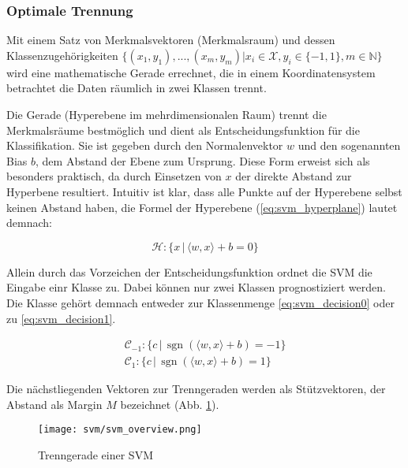 \subsubsection{Optimale Trennung}
Mit einem Satz von Merkmalsvektoren (Merkmalsraum) und dessen Klassenzugehörigkeiten $\{ (x_1, y_1), ..., (x_m, y_m) | x_i \in \mathcal{X}, y_i \in \{-1, 1\}, m \in \mathbb{N} \}$ wird eine mathematische Gerade errechnet,
die in einem Koordinatensystem betrachtet die Daten räumlich in zwei Klassen trennt. 



Die Gerade (Hyperebene im mehrdimensionalen Raum) trennt die Merkmalsräume bestmöglich und dient als Entscheidungsfunktion für die Klassifikation. Sie ist gegeben durch den Normalenvektor $w$ und den sogenannten Bias $b$, dem Abstand der Ebene zum Ursprung. Diese Form erweist sich als besonders praktisch, da durch Einsetzen von $x$ der direkte Abstand zur Hyperbene resultiert.
Intuitiv ist klar, dass alle Punkte auf der Hyperebene selbst keinen Abstand haben, die Formel der Hyperebene (\ref{eq:svm_hyperplane}) lautet demnach: 
 
\begin{equation}
\label{eq:svm_hyperplane}
    \mathcal{H}: \{ x \,|\, \langle w,x \rangle + b = 0 \}
\end{equation}
 
Allein durch das Vorzeichen der Entscheidungsfunktion ordnet die \ac{SVM} die Eingabe einr Klasse zu. Dabei können nur zwei Klassen  prognostiziert werden. Die Klasse gehört demnach entweder zur Klassenmenge \ref{eq:svm_decision0} oder zu \ref{eq:svm_decision1}.

\begin{eqnarray}
    \mathcal{C}_{-1}: \{ c \,|\, \operatorname{sgn}(\langle w,x \rangle + b) = -1 \} \label{eq:svm_decision0} \\
    \mathcal{C}_1: \{ c \,|\, \operatorname{sgn}(\langle w,x \rangle + b) = 1 \} \label{eq:svm_decision1}
\end{eqnarray}

\newpage 

Die nächstliegenden Vektoren zur Trenngeraden werden als Stützvektoren, der Abstand als Margin $M$ bezeichnet (Abb. \ref{fig:svm_separator}). 

\begin{figure}[htbp] \centering
    \texttt{[image: svm/svm\_overview.png]}
    \caption{Trenngerade einer SVM}
    \label{fig:svm_separator}
\end{figure}

